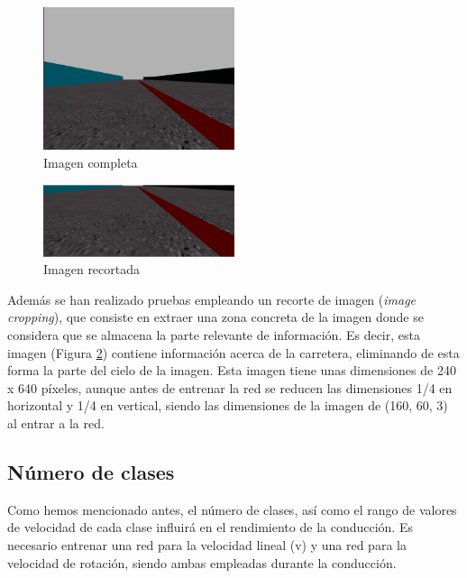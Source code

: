 \begin{figure}
\begin{center}
	\includegraphics[width=0.5\textwidth]{figures/Clasificacion/img_normal.png}
   \caption{Imagen completa}
	\label{fig.completa}
\end{center}
\end{figure}

\begin{figure}
\begin{center}
	\includegraphics[width=0.5\textwidth]{figures/Clasificacion/img_cropped_class.png}
   \caption{Imagen recortada}
	\label{fig.recortada}
\end{center}
\end{figure}

Además se han realizado pruebas empleando un recorte de imagen (\textit{image cropping}), que consiste en extraer una zona concreta de la imagen donde se considera que se almacena la parte relevante de información. Es decir, esta imagen (Figura \ref{fig.recortada}) contiene información acerca de la carretera, eliminando de esta forma la parte del cielo de la imagen. Esta imagen tiene unas dimensiones de 240 x 640 píxeles, aunque antes de entrenar la red se reducen las dimensiones 1/4 en horizontal y 1/4 en vertical, siendo las dimensiones de la imagen de (160, 60, 3) al entrar a la red.



\subsection{Número de clases}

Como hemos mencionado antes, el número de clases, así como el rango de valores de velocidad de cada clase influirá en el rendimiento de la conducción. Es necesario entrenar una red para la velocidad lineal (v) y una red para la velocidad de rotación, siendo ambas empleadas durante la conducción.\\

